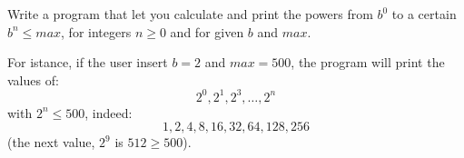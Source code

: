 



\ExamNameLine
\ExamStandardBoxEn
Write a program that let you calculate and print the powers from
$b^0$ to a certain $b^n\le max$, for integers $n\ge 0$ and for given $b$ and $max$.

For istance, if the user insert $b=2$ and $max=500$, the program will
print the values of:
$$
2^0,2^1,2^3,\dots,2^n
$$
with $2^n\le 500$, indeed:
$$
1, 2, 4,8,16,32,64,128,256
$$
(the next value, $2^9$ is $512\ge 500$).

